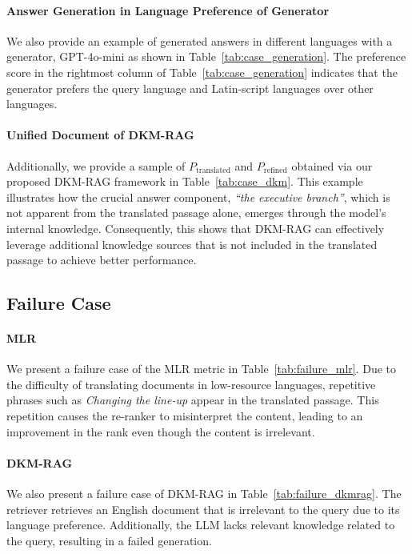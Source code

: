 \paragraph{Answer Generation in Language Preference of Generator}

We also provide an example of generated answers in different languages with a generator, GPT-4o-mini as shown in Table~\ref{tab:case_generation}. The preference score in the rightmost column of Table~\ref{tab:case_generation} indicates that the generator prefers the query language and Latin-script languages over other languages.



\paragraph{Unified Document of DKM-RAG}

Additionally, we provide a sample of \(\displaystyle P_{\text{translated}}\) and \(\displaystyle P_{\text{refined}}\) obtained via our proposed DKM-RAG framework in Table~\ref{tab:case_dkm}. 
This example illustrates how the crucial answer component, \textit{``the executive branch''}, which is not apparent from the translated passage alone, emerges through the model’s internal knowledge. 
Consequently, this shows that DKM-RAG can effectively leverage additional knowledge sources that is not included in the translated passage to achieve better performance.

\subsection{Failure Case}
\paragraph{MLR}
We present a failure case of the MLR metric in Table~\ref{tab:failure_mlr}. Due to the difficulty of translating documents in low-resource languages, repetitive phrases such as \textit{Changing the line-up} appear in the translated passage. This repetition causes the re-ranker to misinterpret the content, leading to an improvement in the rank even though the content is irrelevant.

\paragraph{DKM-RAG}
We also present a failure case of DKM-RAG in Table~\ref{tab:failure_dkmrag}. The retriever retrieves an English document that is irrelevant to the query due to its language preference. Additionally, the LLM lacks relevant knowledge related to the query, resulting in a failed generation.



